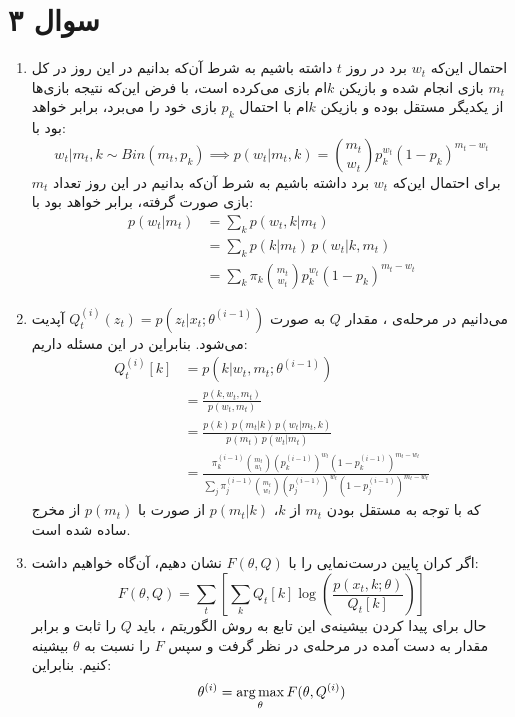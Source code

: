 \documentclass[a4paper, 12pt]{article}
\begin{document}
\section*{سوال ۳}
\begin{enumerate}
	\item
	احتمال این‌که $w_t$ برد در روز $t$ داشته باشیم به شرط آن‌که بدانیم در این روز در کل $m_t$ بازی انجام شده و بازیکن $k$ام بازی می‌کرده است، با فرض این‌که نتیجه بازی‌ها از یکدیگر مستقل بوده و بازیکن $k$ام با احتمال $p_k$ بازی خود را می‌برد، برابر خواهد بود با:
	\[
	w_t|m_t,k \sim Bin(m_t, p_k) \implies p(w_t|m_t, k) = \binom{m_t}{w_t}p_k^{w_t}(1-p_k)^{m_t-w_t}
	\]
	برای احتمال این‌که $w_t$ برد داشته باشیم به شرط آن‌که بدانیم در این روز تعداد $m_t$ بازی صورت گرفته، برابر خواهد بود با:
	\[
	\begin{aligned}
		p(w_t|m_t) &= \sum_k p(w_t, k|m_t) \\[0.4em]
		&= \sum_k p(k|m_t)\,p(w_t|k, m_t) \\[0.4em]
		&= \sum_k \pi_k \binom{m_t}{w_t}p_k^{w_t}(1-p_k)^{m_t-w_t}
	\end{aligned}
	\]
	\item
	می‌دانیم در مرحله‌ی ، مقدار $Q$ به صورت 
	$Q^{(i)}_t(z_t) = p(z_t|x_t;\theta^{(i-1)})$
	آپدیت می‌شود. بنابراین در این مسئله داریم:
	\[
	\begin{aligned}
		Q_t^{(i)}[k] &= p(k|w_t, m_t; \theta^{(i-1)}) \\[0.6em]
		&= \frac{p(k, w_t, m_t)}{p(w_t, m_t)} \\[0.6em]
		&= \frac{p(k)\,p(m_t|k)\,p(w_t|m_t,k)}{p(m_t)\,p(w_t|m_t)} \\[0.6em]
		&= \boxed{\frac{\pi_k^{(i-1)} \binom{m_t}{w_t} \left(p_k^{(i-1)}\right)^{w_t} \left(1-p_k^{(i-1)}\right)^{m_t-w_t}}{\sum_j \pi_j^{(i-1)} \binom{m_t}{w_t} \left(p_j^{(i-1)}\right)^{w_t} \left(1-p_j^{(i-1)}\right)^{m_t-w_t}}}
	\end{aligned}
	\]
	که با توجه به مستقل بودن $m_t$ از $k$،
	$p(m_t|k)$
	از صورت با
	$p(m_t)$
	از مخرج ساده شده است.
	\item
	اگر کران پایین درست‌نمایی را با $F(\theta, Q)$ نشان دهیم، آن‌گاه خواهیم داشت:
	\[
	F(\theta, Q) = \sum_t\left[ \sum_k Q_t[k] \log\left(\frac{p(x_t, k; \theta)}{Q_t[k]}\right) \right] 
	\]
	حال برای پیدا کردن بیشینه‌ی این تابع به روش الگوریتم ، باید $Q$ را ثابت و برابر مقدار به دست آمده در مرحله‌ی  در نظر گرفت و سپس $F$ را نسبت به $\theta$ بیشینه کنیم. بنابراین:
	\[
	\begin{aligned}
		\theta^{(i)} &= \argmax_\theta F(\theta, Q^{(i)}) \\[0.5em]

\end{aligned}\]
\end{enumerate}
\end{document}
